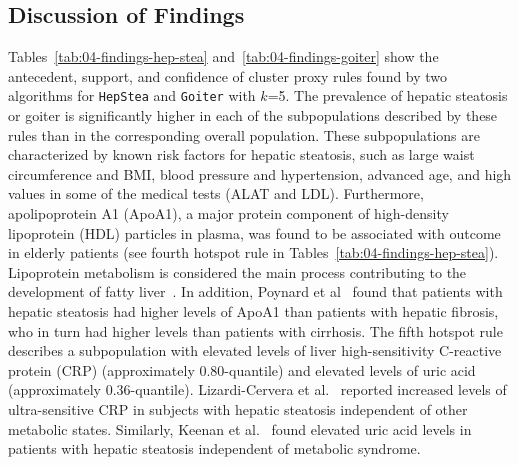 \documentclass[
  oneside]{book}
\begin{document}
\hypertarget{sdclu-discussion}{%
\subsection{Discussion of Findings}\label{sdclu-discussion}}

Tables~\ref{tab:04-findings-hep-stea} and~\ref{tab:04-findings-goiter} show the antecedent, support, and confidence of cluster proxy rules found by two algorithms for \texttt{HepStea} and \texttt{Goiter} with \(k\)=5.
The prevalence of hepatic steatosis or goiter is significantly higher in each of the subpopulations described by these rules than in the corresponding overall population.
These subpopulations are characterized by known risk factors for hepatic steatosis, such as large waist circumference and BMI, blood pressure and hypertension, advanced age, and high values in some of the medical tests (ALAT and LDL).
Furthermore, apolipoprotein A1 (ApoA1), a major protein component of high-density lipoprotein (HDL) particles in plasma, was found to be associated with outcome in elderly patients (see fourth hotspot rule in Tables~\ref{tab:04-findings-hep-stea}).
Lipoprotein metabolism is considered the main process contributing to the development of fatty liver~\autocite{jiang2013lipoprotein}.
In addition, Poynard et al~\autocite{poynard1986apolipoprotein} found that patients with hepatic steatosis had higher levels of ApoA1 than patients with hepatic fibrosis, who in turn had higher levels than patients with cirrhosis.
The fifth hotspot rule describes a subpopulation with elevated levels of liver high-sensitivity C-reactive protein (CRP) (approximately 0.80-quantile) and elevated levels of uric acid (approximately 0.36-quantile).
Lizardi-Cervera et al.~\autocite{lizardi2007association} reported increased levels of ultra-sensitive CRP in subjects with hepatic steatosis independent of other metabolic states.
Similarly, Keenan et al.~\autocite{keenan2012relation} found elevated uric acid levels in patients with hepatic steatosis independent of metabolic syndrome.
\end{document}
